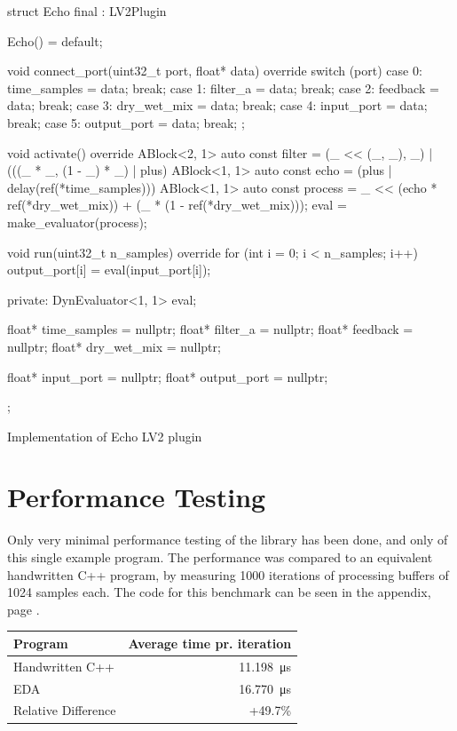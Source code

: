 \begin{listing}
  \begin{cppcodenl}
  struct Echo final : LV2Plugin {
    Echo() = default;

    void connect_port(uint32_t port, float* data) override
    {
      switch (port) {
        case 0: time_samples = data; break;
        case 1: filter_a = data; break;
        case 2: feedback = data; break;
        case 3: dry_wet_mix = data; break;
        case 4: input_port = data; break;
        case 5: output_port = data; break;
      }
    };

    void activate() override
    {
      ABlock<2, 1> auto const filter = (_ << (_, _), _) | (((_ * _, (1 - _) * _) | plus) %
      ABlock<1, 1> auto const echo = (plus | delay(ref(*time_samples))) %
      ABlock<1, 1> auto const process = _ << (echo * ref(*dry_wet_mix)) + (_ * (1 - ref(*dry_wet_mix)));
      eval = make_evaluator(process);
    }

    void run(uint32_t n_samples) override
    {
      for (int i = 0; i < n_samples; i++) {
        output_port[i] = eval(input_port[i]);
      }
    }
    
  private:
    DynEvaluator<1, 1> eval;

    float* time_samples = nullptr;
    float* filter_a = nullptr;
    float* feedback = nullptr;
    float* dry_wet_mix = nullptr;
    
    float* input_port = nullptr;
    float* output_port = nullptr;
  };
  \end{cppcodenl}
  \caption{Implementation of Echo LV2 plugin}
  \label{lst:echo_lv2}
\end{listing}

\section{Performance Testing}

Only very minimal performance testing of the library has been done, and only of this single example program.
The performance was compared to an equivalent handwritten C++ program, by measuring 1000 iterations of
processing buffers of 1024 samples each. The code for this benchmark can be seen in the appendix, page
\pageref{codefile:tests/benchmarks.cpp}.

\begin{table}[H]
  \centering
  \begin{tabular}{|l|r|}
    \hline
    Program             & Average time pr. iteration \\
    \hline\hline
    Handwritten C++     & \SI{11.198}{\micro\second} \\
    EDA                 & \SI{16.770}{\micro\second} \\
    \hline\hline
    Relative Difference & +49.7\%                    \\
    \hline
  \end{tabular}
\end{table}


